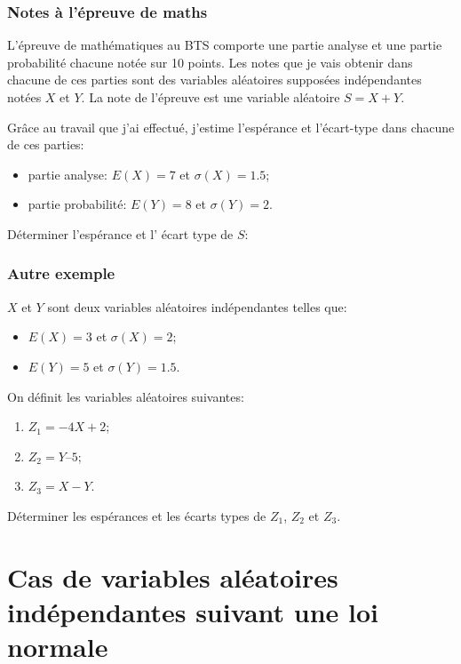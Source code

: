 \documentclass[a4paper,12pt]{scrartcl}
\begin{document}
\subsubsection{Notes à l'épreuve de maths}

L'épreuve de mathématiques au BTS comporte une partie analyse et une partie probabilité chacune notée sur 10 points. Les notes que je vais obtenir dans chacune de ces parties sont des variables aléatoires supposées indépendantes notées $X$ et $Y$. La note de l'épreuve est une variable aléatoire $S = X+ Y$. 

Grâce au travail que j'ai effectué, j'estime l'espérance et l'écart-type dans chacune de ces parties: 

\begin{itemize}
 \item partie analyse: $E(X) = 7$ et $\sigma(X) = 1.5$;
 \item partie probabilité: $E(Y) = 8$ et $\sigma(Y) = 2$.
\end{itemize}

Déterminer l'espérance et l' écart type de $S$:


\subsubsection{Autre exemple}

$X$ et $Y$ sont deux variables aléatoires indépendantes telles que: 

\begin{itemize}
 \item $E(X) = 3$ et $\sigma(X) = 2$;
 \item $E(Y) = 5$ et $\sigma(Y) = 1.5$.
\end{itemize}

On définit les variables aléatoires suivantes:

\begin{enumerate}
 \item $Z_1 = -4X + 2$;
 \item $Z_2 = Y – 5$;
 \item $Z_3 = X-Y$.
\end{enumerate}

Déterminer les espérances et les écarts types de $Z_1$, $Z_2$ et $Z_3$. 


\section[Variables indépendantes et loi normale]{Cas de variables aléatoires indépendantes suivant une loi normale}
\end{document}
